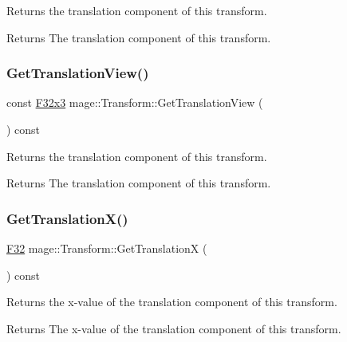 Returns the translation component of this transform.

\begin{DoxyReturn}{Returns}
The translation component of this transform. 
\end{DoxyReturn}
\mbox{\label{classmage_1_1_transform_a78be45f1e45a86c86f5d1c3a6299b04a}} 
\subsubsection{\texorpdfstring{Get\+Translation\+View()}{GetTranslationView()}}
{\footnotesize\ttfamily const \mbox{\hyperlink{namespacemage_a1e3c7a882af461f161caa1cbddaf1fa2}{F32x3}} mage\+::\+Transform\+::\+Get\+Translation\+View (\begin{DoxyParamCaption}{ }\end{DoxyParamCaption}) const\hspace{0.3cm}{\ttfamily [noexcept]}}

Returns the translation component of this transform.

\begin{DoxyReturn}{Returns}
The translation component of this transform. 
\end{DoxyReturn}
\mbox{\label{classmage_1_1_transform_a90b2c059a45964bf4de816a4b7e6c55c}} 
\subsubsection{\texorpdfstring{Get\+Translation\+X()}{GetTranslationX()}}
{\footnotesize\ttfamily \mbox{\hyperlink{namespacemage_aa97e833b45f06d60a0a9c4fc22ae02c0}{F32}} mage\+::\+Transform\+::\+Get\+TranslationX (\begin{DoxyParamCaption}{ }\end{DoxyParamCaption}) const\hspace{0.3cm}{\ttfamily [noexcept]}}

Returns the x-\/value of the translation component of this transform.

\begin{DoxyReturn}{Returns}
The x-\/value of the translation component of this transform. 
\end{DoxyReturn}
\mbox{\label{classmage_1_1_transform_a3a806edeeca4db92bdfa4d401ba17cb4}} 
